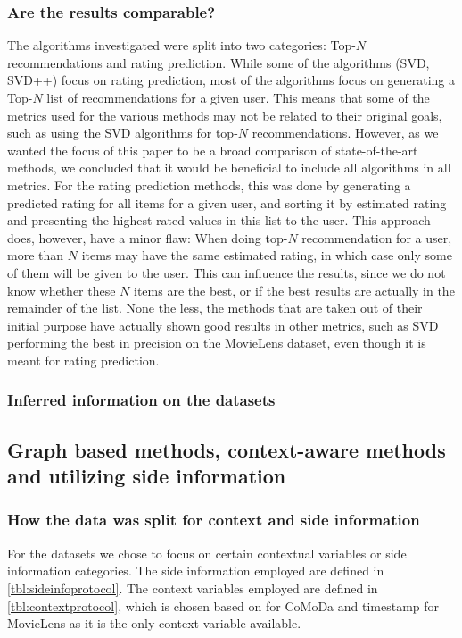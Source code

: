 \subsubsection{Are the results comparable?}
The algorithms investigated were split into two categories: Top-$N$ recommendations and rating prediction.
While some of the algorithms (SVD, SVD++) focus on rating prediction, most of the algorithms focus on generating a Top-$N$ list of recommendations for a given user.
This means that some of the metrics used for the various methods may not be related to their original goals, such as using the SVD algorithms for top-$N$ recommendations.
However, as we wanted the focus of this paper to be a broad comparison of state-of-the-art methods, we concluded that it would be beneficial to include all algorithms in all metrics.
For the rating prediction methods, this was done by generating a predicted rating for all items for a given user, and sorting it by estimated rating and presenting the highest rated values in this list to the user.
This approach does, however, have a minor flaw: When doing top-$N$ recommendation for a user, more than $N$ items may have the same estimated rating, in which case only some of them will be given to the user.
This can influence the results, since we do not know whether these $N$ items are the best, or if the best results are actually in the remainder of the list.
None the less, the methods that are taken out of their initial purpose have actually shown good results in other metrics, such as SVD performing the best in precision on the MovieLens dataset, even though it is meant for rating prediction.

\subsubsection{Inferred information on the datasets} %


\subsection{Graph based methods, context-aware methods and utilizing side information}
\subsubsection{How the data was split for context and side information}
For the datasets we chose to focus on certain contextual variables or side information categories.
The side information employed are defined in \autoref{tbl:sideinfoprotocol}.
The context variables employed are defined in \autoref{tbl:contextprotocol}, which is chosen based on \cite{COMODA2013} for CoMoDa and timestamp for MovieLens as it is the only context variable available.

